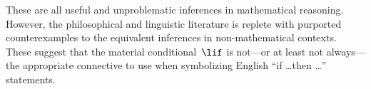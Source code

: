 \documentclass[../../../include/open-logic-section]{subfiles}
\begin{document}
These are all useful and unproblematic inferences in mathematical
reasoning. However, the philosophical and linguistic literature is
replete with purported counterexamples to the equivalent inferences in
non-mathematical contexts. These suggest that the material
conditional~$\lif$ is not---or at least not always---the appropriate
connective to use when symbolizing English ``if \dots then \dots''
statements.
\end{document}

